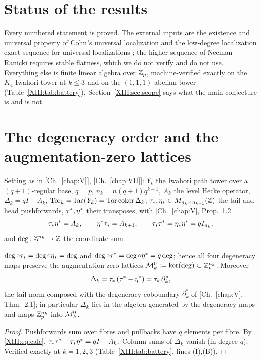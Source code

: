 \section*{Status of the results}

Every numbered statement is proved. The external inputs are the existence and universal
property of Cohn's universal localization \cite{Co} and the low-degree localization exact
sequence for universal localizations \cite[Ch.~4]{Sch}; the higher sequence of
Neeman--Ranicki \cite{NR} requires stable flatness, which we do not verify and do not use.
Everything else is finite linear algebra over $\mathbb{Z}_p$, machine-verified exactly on the $K_4$
Iwahori tower at $k\le3$ and on the $(1,1,1)$ abelian tower (Table~\ref{XIII:tab:battery}).
Section~\ref{XIII:sec:scope} says what the main conjecture is and is not.

\section{The degeneracy order and the augmentation-zero lattices}\label{XIII:sec:order}

Setting as in [Ch.~\ref{chap:V}], [Ch.~\ref{chap:VII}]: $Y_k$ the Iwahori path tower over a $(q{+}1)$-regular base,
$q=p$, $n_k=n(q{+}1)q^{k-1}$, $A_k$ the level Hecke operator, $\Delta_k=qI-A_k$,
$\operatorname{Tor}_k=\operatorname{Jac}(Y_k)=\operatorname{Tor}\operatorname{coker}\Delta_k$; $\tau_*,\eta_*\in M_{n_k\times n_{k+1}}(\mathbb{Z})$ the tail and head
pushforwards, $\tau^*,\eta^*$ their transposes, with [Ch.~\ref{chap:V}, Prop.~1.2]
\begin{equation}\label{XIII:eq:calc}
\tau_*\eta^*=A_k,\qquad \eta^*\tau_*=A_{k+1},\qquad \tau_*\tau^*=\eta_*\eta^*=qI_{n_k},
\end{equation}
and $\deg\colon\mathbb{Z}^{n_k}\to\mathbb{Z}$ the coordinate sum.

\begin{lemma}\label{XIII:lem:deg}
$\deg\circ\tau_*=\deg\circ\eta_*=\deg$ and $\deg\circ\tau^*=\deg\circ\eta^*=q\deg$; hence all four
degeneracy maps preserve the augmentation-zero lattices $\mathcal{M}^{0}_k:=\ker(\deg)\subset\mathbb{Z}_p^{n_k}$.
Moreover
\[
\Delta_k=\tau_*\,(\tau^*-\eta^*)=\tau_*\,\partial_k^{*},
\]
the tail norm composed with the degeneracy coboundary $\partial_k^{*}$ of {\rm[Ch.~\ref{chap:V}, Thm.~2.1]};
in particular $\Delta_k$ lies in the algebra generated by the degeneracy maps and maps
$\mathbb{Z}_p^{n_k}$ into $\mathcal{M}^{0}_k$.
\end{lemma}

\begin{proof}
Pushforwards sum over fibres and pullbacks have $q$ elements per fibre. By \eqref{XIII:eq:calc},
$\tau_*\tau^*-\tau_*\eta^*=qI-A_k$. Column sums of $\Delta_k$ vanish (in-degree $q$). Verified exactly
at $k=1,2,3$ (Table~\ref{XIII:tab:battery}, lines (I),(B)).
\end{proof}

